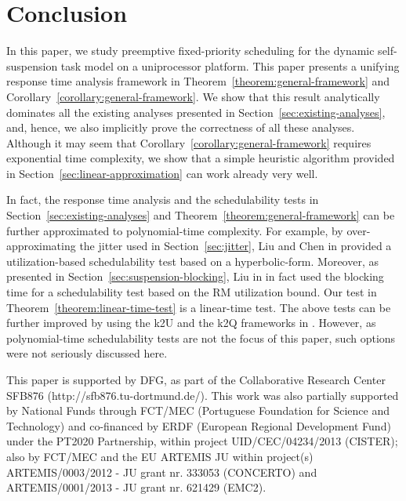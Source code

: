 \documentclass[conference]{IEEEtran}
\begin{document}




























\section{Conclusion}
\label{sec:conclusion}


In this paper, we study preemptive fixed-priority scheduling for the
dynamic self-suspension task model on a uniprocessor platform. This
paper presents a unifying response time analysis framework in
Theorem~\ref{theorem:general-framework} and
Corollary~\ref{corollary:general-framework}. We show that this result
analytically dominates all the existing analyses presented in
Section~\ref{sec:existing-analyses}, and, hence, we also implicitly
prove the correctness of all these analyses. Although it may seem that
Corollary~\ref{corollary:general-framework} requires exponential time
complexity, we show that a simple heuristic algorithm provided in
Section~\ref{sec:linear-approximation} can work already very well.

In fact, the response time analysis and the schedulability tests in
Section~\ref{sec:existing-analyses} and
Theorem~\ref{theorem:general-framework} can be further approximated to
polynomial-time complexity. For example, by over-approximating the
jitter used in Section~\ref{sec:jitter}, Liu and Chen
in \cite{LiuChen:rtss2014} provided a utilization-based schedulability
test based on a hyperbolic-form. Moreover, as presented in
Section~\ref{sec:suspension-blocking}, Liu in \cite{Liu:2000:RS:518501}
in fact used the blocking time for a schedulability test based on the
RM utilization bound. Our test in
Theorem~\ref{theorem:linear-time-test} is a linear-time test. The
above tests can be further improved by using the k2U and the k2Q
frameworks
in \cite{ChenHLRTSS2015,DBLP:journals/corr/ChenHL15b}. However, as
polynomial-time schedulability tests are not the focus of this paper,
such options were not seriously discussed here.

 This paper is supported by DFG, as part of the Collaborative Research Center SFB876 (http://sfb876.tu-dortmund.de/). This work was also partially supported by National Funds through FCT/MEC (Portuguese Foundation for Science and Technology) and co-financed by ERDF (European Regional Development Fund) under the PT2020 Partnership, within project UID/CEC/04234/2013 (CISTER); also by FCT/MEC and the EU ARTEMIS JU within project(s) ARTEMIS/0003/2012 - JU grant nr. 333053 (CONCERTO) and ARTEMIS/0001/2013 - JU grant nr. 621429 (EMC2).

{}
\end{document}
